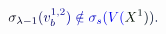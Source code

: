 \documentclass[12pt]{article}
\begin{document}
\makeatletter
\renewcommand*{\@textcolor}[3]{%
  \protect\leavevmode
  \begingroup
    \color#1{#2}#3%
  \endgroup
}
\makeatother
\begin{displaymath}
\mathcolor[RGB]{0,0,15}{\sigma} _ { \mathcolor[RGB]{0,0,30}{\lambda} \mathcolor[RGB]{0,0,45}{-} \mathcolor[RGB]{0,0,60}{1} } \mathcolor[RGB]{0,0,75}{(} \mathcolor[RGB]{0,0,90}{v} _ { \mathcolor[RGB]{0,0,105}{b} } ^ { \mathcolor[RGB]{0,0,120}{1} \mathcolor[RGB]{0,0,135}{,} \mathcolor[RGB]{0,0,150}{2} } \mathcolor[RGB]{0,0,165}{)} \mathcolor[RGB]{0,0,180}{\notin} \mathcolor[RGB]{0,0,195}{\sigma} _ { \mathcolor[RGB]{0,0,210}{s} } \mathcolor[RGB]{0,0,225}{(} \mathcolor[RGB]{0,0,240}{V} \mathcolor[RGB]{0,0,255}{(} \mathcolor[RGB]{0,15,0}{X} ^ { \mathcolor[RGB]{0,15,15}{1} } \mathcolor[RGB]{0,15,30}{)} \mathcolor[RGB]{0,15,45}{)} \mathcolor[RGB]{0,15,60}{.}
\end{displaymath}
\end{document}

